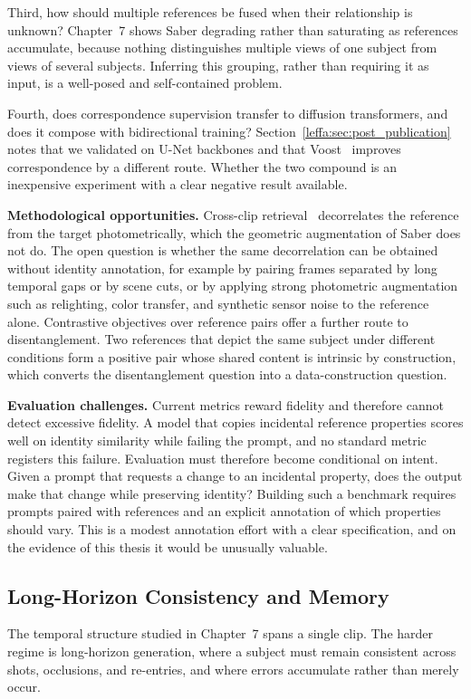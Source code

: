 Third, how should multiple references be fused when their relationship is unknown? Chapter~7 shows Saber degrading rather than saturating as references accumulate, because nothing distinguishes multiple views of one subject from views of several subjects. Inferring this grouping, rather than requiring it as input, is a well-posed and self-contained problem.

Fourth, does correspondence supervision transfer to diffusion transformers, and does it compose with bidirectional training? Section~\ref{leffa:sec:post_publication} notes that we validated \leffa{} on U-Net backbones and that Voost~\citep{lee2025voost} improves correspondence by a different route. Whether the two compound is an inexpensive experiment with a clear negative result available.

\noindent \textbf{Methodological opportunities.}
Cross-clip retrieval~\citep{xu2026vera} decorrelates the reference from the target photometrically, which the geometric augmentation of Saber does not do. The open question is whether the same decorrelation can be obtained without identity annotation, for example by pairing frames separated by long temporal gaps or by scene cuts, or by applying strong photometric augmentation such as relighting, color transfer, and synthetic sensor noise to the reference alone. Contrastive objectives over reference pairs offer a further route to disentanglement. Two references that depict the same subject under different conditions form a positive pair whose shared content is intrinsic by construction, which converts the disentanglement question into a data-construction question.

\noindent \textbf{Evaluation challenges.}
Current metrics reward fidelity and therefore cannot detect excessive fidelity. A model that copies incidental reference properties scores well on identity similarity while failing the prompt, and no standard metric registers this failure. Evaluation must therefore become conditional on intent. Given a prompt that requests a change to an incidental property, does the output make that change while preserving identity? Building such a benchmark requires prompts paired with references and an explicit annotation of which properties should vary. This is a modest annotation effort with a clear specification, and on the evidence of this thesis it would be unusually valuable.

\subsection{Long-Horizon Consistency and Memory}
The temporal structure studied in Chapter~7 spans a single clip. The harder regime is long-horizon generation, where a subject must remain consistent across shots, occlusions, and re-entries, and where errors accumulate rather than merely occur.

